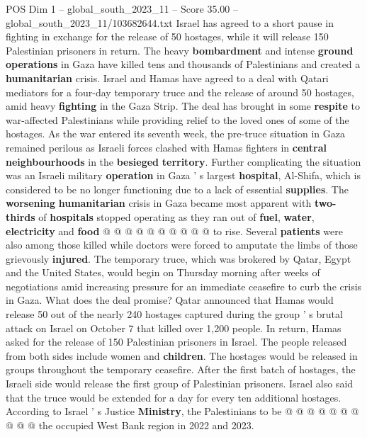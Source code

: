\begin{textsample}{POS Dim 1 – global\_south\_2023\_11 – Score 35.00 – global\_south\_2023\_11/103682644.txt}  \label{ex:f1_pos_126}
Israel has agreed to a short pause in fighting in exchange for the release of 50 hostages, while it will release 150 Palestinian prisoners in return.
The heavy \textbf{bombardment} and intense \textbf{ground} \textbf{operations} in Gaza have killed tens and thousands of Palestinians and created a \textbf{humanitarian} crisis.
Israel and Hamas have agreed to a deal with Qatari mediators for a four-day temporary truce and the release of around 50 hostages, amid heavy \textbf{fighting} in the Gaza Strip.
The deal has brought in some \textbf{respite} to war-affected Palestinians while providing relief to the loved ones of some of the hostages.
As the war entered its seventh week, the pre-truce situation in Gaza remained perilous as Israeli forces clashed with Hamas fighters in \textbf{central} \textbf{neighbourhoods} in the \textbf{besieged} \textbf{territory}.
Further complicating the situation was an Israeli military \textbf{operation} in Gaza ' s largest \textbf{hospital}, Al-Shifa, which is considered to be no longer functioning due to a lack of essential \textbf{supplies}.
The \textbf{worsening} \textbf{humanitarian} crisis in Gaza became most apparent with \textbf{two-thirds} of \textbf{hospitals} stopped operating as they ran out of \textbf{fuel}, \textbf{water}, \textbf{electricity} and \textbf{food} @ @ @ @ @ @ @ @ @ @ to rise.
Several \textbf{patients} were also among those killed while doctors were forced to amputate the limbs of those grievously \textbf{injured}.
The temporary truce, which was brokered by Qatar, Egypt and the United States, would begin on Thursday morning after weeks of negotiations amid increasing pressure for an immediate ceasefire to curb the crisis in Gaza.
What does the deal promise?
Qatar announced that Hamas would release 50 out of the nearly 240 hostages captured during the group ' s brutal attack on Israel on October 7 that killed over 1,200 people.
In return, Hamas asked for the release of 150 Palestinian prisoners in Israel.
The people released from both sides include women and \textbf{children}.
The hostages would be released in groups throughout the temporary ceasefire.
After the first batch of hostages, the Israeli side would release the first group of Palestinian prisoners.
Israel also said that the truce would be extended for a day for every ten additional hostages.
According to Israel ' s Justice \textbf{Ministry}, the Palestinians to be @ @ @ @ @ @ @ @ @ @ the occupied West Bank region in 2022 and 2023.

\end{textsample}
